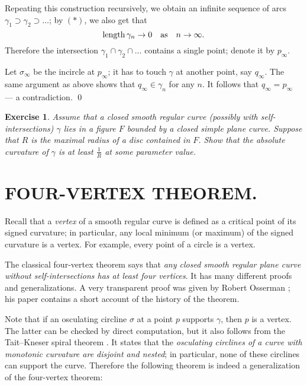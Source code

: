 \documentclass{article}
\theoremstyle{theorem}
\newtheorem*{exercise}{Exercise}
\theoremstyle{definition}
\begin{document}
Repeating this construction recursively,
we obtain an infinite sequence of arcs $\gamma_1\supset \gamma_2\supset\dots$;
by $({*})$, we also get that 
\[\mathop{\rm length}\nolimits\gamma_n\to0\quad\text{as}\quad n\to\infty.\] 
Therefore the intersection $\gamma_1\cap\gamma_2\cap\dots$
contains a single point; denote it by $p_\infty$.

Let $\sigma_\infty$ be the incircle at $p_\infty$; it has to touch $\gamma$ at another point, say $q_\infty$.
The same argument as above shows that $q_\infty\in\gamma_n$ for any $n$.
It follows that $q_\infty =p_\infty$ --- a contradiction.
\qed

\begin{exercise}\label{ex:moon-rad}
Assume that a closed smooth regular curve (possibly with self-intersections) $\gamma$  lies in a figure $F$ bounded by a closed simple plane curve.
Suppose that $R$ is the maximal radius of a disc contained in $F$.
Show that the absolute curvature of $\gamma$ is at least $\tfrac1R$ at some parameter value.
\end{exercise}


\section*{FOUR-VERTEX THEOREM.}
Recall that a \emph{vertex} of a smooth regular curve is defined as a critical point of its signed curvature;
in particular, any local minimum (or maximum) of the signed curvature is a vertex.
For example, every point of a circle is a vertex.

The classical four-vertex theorem says that \emph{any closed smooth regular plane curve without self-intersections has at least four vertices}.
It has many different proofs and generalizations.
A very transparent proof was given by Robert Osserman \cite{osserman}; his paper contains a short account of the history of the theorem.

Note that if an osculating circline $\sigma$ at a point $p$ supports $\gamma$, then $p$ is a vertex.
The latter can be checked by direct computation, but it also follows from the Tait--Kneser spiral theorem \cite{ghys-tabachnikov-timorin}.
It states that the \emph{osculating circlines of a curve with monotonic curvature are disjoint and nested};
in particular, none of these circlines can support the curve.
Therefore the following theorem is indeed a generalization of the four-vertex theorem:
\end{document}
